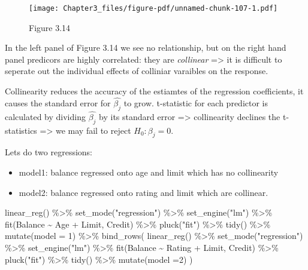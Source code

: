 \documentclass[
  letterpaper,
  DIV=11,
  numbers=noendperiod]{scrreprt}
\newenvironment{Shaded}{\begin{snugshade}}{\end{snugshade}}
\newcommand{\AttributeTok}[1]{\textcolor[rgb]{0.65,0.35,0.00}{#1}}
\newcommand{\DecValTok}[1]{\textcolor[rgb]{0.47,0.16,0.63}{#1}}
\newcommand{\FunctionTok}[1]{\textcolor[rgb]{0.02,0.16,0.49}{#1}}
\newcommand{\NormalTok}[1]{\textcolor[rgb]{0.33,0.33,0.33}{#1}}
\newcommand{\SpecialCharTok}[1]{\textcolor[rgb]{0.00,0.46,0.62}{#1}}
\newcommand{\StringTok}[1]{\textcolor[rgb]{0.00,0.50,0.00}{#1}}
\providecommand{\tightlist}{%
  \setlength{\itemsep}{0pt}\setlength{\parskip}{0pt}}\usepackage{longtable,booktabs,array}
\begin{document}
\begin{figure}[H]

{\centering \texttt{[image: Chapter3\_files/figure-pdf/unnamed-chunk-107-1.pdf]}

}

\caption{Figure 3.14}

\end{figure}

In the left panel of Figure 3.14 we see no relationship, but on the
right hand panel predicors are highly correlated: they are
\emph{collinear} =\textgreater{} it is difficult to seperate out the
individual effects of colliniar varaibles on the response.

Collinearity reduces the accuracy of the estiamtes of the regression
coefficients, it causes the standard error for \(\hat{\beta_j}\) to
grow. t-statistic for each predictor is calculated by dividing
\(\hat{\beta_j}\) by its standard error =\textgreater{} collinearity
declines the t-statistics =\textgreater{} we may fail to reject
\(H_0:\beta_j = 0\).

Lets do two regressions:

\begin{itemize}
\tightlist
\item
  model1: balance regressed onto age and limit which has no collinearity
\item
  model2: balance regressed onto rating and limit which are collinear.
\end{itemize}

\begin{Shaded}
\begin{Highlighting}[]
\FunctionTok{linear\_reg}\NormalTok{() }\SpecialCharTok{\%\textgreater{}\%} 
  \FunctionTok{set\_mode}\NormalTok{(}\StringTok{"regression"}\NormalTok{) }\SpecialCharTok{\%\textgreater{}\%} 
  \FunctionTok{set\_engine}\NormalTok{(}\StringTok{"lm"}\NormalTok{) }\SpecialCharTok{\%\textgreater{}\%} 
  \FunctionTok{fit}\NormalTok{(Balance }\SpecialCharTok{\textasciitilde{}}\NormalTok{ Age }\SpecialCharTok{+}\NormalTok{ Limit, Credit) }\SpecialCharTok{\%\textgreater{}\%} 
  \FunctionTok{pluck}\NormalTok{(}\StringTok{"fit"}\NormalTok{) }\SpecialCharTok{\%\textgreater{}\%} 
  \FunctionTok{tidy}\NormalTok{() }\SpecialCharTok{\%\textgreater{}\%} \FunctionTok{mutate}\NormalTok{(}\AttributeTok{model =} \DecValTok{1}\NormalTok{) }\SpecialCharTok{\%\textgreater{}\%} 
  \FunctionTok{bind\_rows}\NormalTok{(}
    \FunctionTok{linear\_reg}\NormalTok{() }\SpecialCharTok{\%\textgreater{}\%} 
  \FunctionTok{set\_mode}\NormalTok{(}\StringTok{"regression"}\NormalTok{) }\SpecialCharTok{\%\textgreater{}\%} 
  \FunctionTok{set\_engine}\NormalTok{(}\StringTok{"lm"}\NormalTok{) }\SpecialCharTok{\%\textgreater{}\%} 
  \FunctionTok{fit}\NormalTok{(Balance }\SpecialCharTok{\textasciitilde{}}\NormalTok{ Rating }\SpecialCharTok{+}\NormalTok{ Limit, Credit) }\SpecialCharTok{\%\textgreater{}\%} 
  \FunctionTok{pluck}\NormalTok{(}\StringTok{"fit"}\NormalTok{) }\SpecialCharTok{\%\textgreater{}\%} 
  \FunctionTok{tidy}\NormalTok{() }\SpecialCharTok{\%\textgreater{}\%} \FunctionTok{mutate}\NormalTok{(}\AttributeTok{model =}\DecValTok{2}\NormalTok{)}
\NormalTok{  )}
\end{Highlighting}
\end{Shaded}
\end{document}
